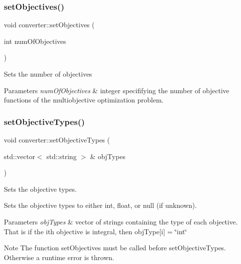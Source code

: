 \subsubsection{\texorpdfstring{set\+Objectives()}{setObjectives()}}
{\footnotesize\ttfamily void converter\+::set\+Objectives (\begin{DoxyParamCaption}\item[{int}]{num\+Of\+Objectives }\end{DoxyParamCaption})\hspace{0.3cm}{\ttfamily [inline]}}

Sets the number of objectives 
\begin{DoxyParams}{Parameters}
{\em num\+Of\+Objectives} & integer specififying the number of objective functions of the multiobjective optimization problem. \\
\hline
\end{DoxyParams}
\mbox{\label{classconverter_a44373216fde05163ca7c5267088145fa}} 
\subsubsection{\texorpdfstring{set\+Objective\+Types()}{setObjectiveTypes()}}
{\footnotesize\ttfamily void converter\+::set\+Objective\+Types (\begin{DoxyParamCaption}\item[{std\+::vector$<$ std\+::string $>$ \&}]{obj\+Types }\end{DoxyParamCaption})}



Sets the objective types. 

Sets the objective types to either int, float, or null (if unknown). 
\begin{DoxyParams}{Parameters}
{\em obj\+Types} & vector of strings containing the type of each objective. That is if the i\textquotesingle{}th objective is integral, then obj\+Type\mbox{[}i\mbox{]} = \char`\"{}int\char`\"{} \\
\hline
\end{DoxyParams}
\begin{DoxyNote}{Note}
The function set\+Objectives must be called before set\+Objective\+Types. Otherwise a runtime error is thrown. 
\end{DoxyNote}
\mbox{\label{classconverter_a6d1331eb4b80868ff8d8251cea497a82}} 
